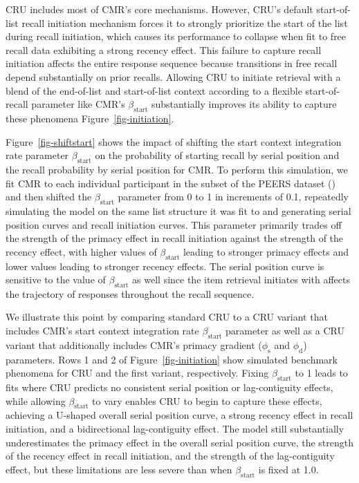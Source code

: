 \documentclass[
  man,
  floatsintext,
  longtable,
  nolmodern,
  notxfonts,
  notimes,
  draftfirst,
  colorlinks=true,linkcolor=blue,citecolor=blue,urlcolor=blue]{apa7}
\begin{document}
CRU includes most of CMR's core mechanisms. However, CRU's default
start-of-list recall initiation mechanism forces it to strongly
prioritize the start of the list during recall initiation, which causes
its performance to collapse when fit to free recall data exhibiting a
strong recency effect. This failure to capture recall initiation affects
the entire response sequence because transitions in free recall depend
substantially on prior recalls. Allowing CRU to initiate retrieval with
a blend of the end-of-list and start-of-list context according to a
flexible start-of-recall parameter like CMR's \(\beta_\text{start}\)
substantially improves its ability to capture these phenomena
Figure~\ref{fig-initiation}.

Figure~\ref{fig-shiftstart} shows the impact of shifting the start
context integration rate parameter \(\beta_\text{start}\) on the
probability of starting recall by serial position and the recall
probability by serial position for CMR. To perform this simulation, we
fit CMR to each individual participant in the subset of the PEERS
dataset () and
then shifted the \(\beta_\text{start}\) parameter from 0 to 1 in
increments of 0.1, repeatedly simulating the model on the same list
structure it was fit to and generating serial position curves and recall
initiation curves. This parameter primarily trades off the strength of
the primacy effect in recall initiation against the strength of the
recency effect, with higher values of \(\beta_\text{start}\) leading to
stronger primacy effects and lower values leading to stronger recency
effects. The serial position curve is sensitive to the value of
\(\beta_\text{start}\) as well since the item retrieval initiates with
affects the trajectory of responses throughout the recall sequence.

We illustrate this point by comparing standard CRU to a CRU variant that
includes CMR's start context integration rate \(\beta_\text{start}\)
parameter as well as a CRU variant that additionally includes CMR's
primacy gradient (\(\phi_\text{s}\) and \(\phi_\text{d}\)) parameters.
Rows 1 and 2 of Figure~\ref{fig-initiation} show simulated benchmark
phenomena for CRU and the first variant, respectively. Fixing
\(\beta_\text{start}\) to 1 leads to fits where CRU predicts no
consistent serial position or lag-contiguity effects, while allowing
\(\beta_\text{start}\) to vary enables CRU to begin to capture these
effects, achieving a U-shaped overall serial position curve, a strong
recency effect in recall initiation, and a bidirectional lag-contiguity
effect. The model still substantially underestimates the primacy effect
in the overall serial position curve, the strength of the recency effect
in recall initiation, and the strength of the lag-contiguity effect, but
these limitations are less severe than when \(\beta_\text{start}\) is
fixed at 1.0.
\end{document}
